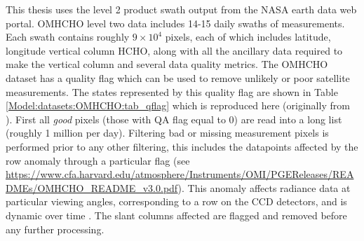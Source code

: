     This thesis uses the level 2 product swath output from the NASA earth data web portal.
    OMHCHO level two data includes 14-15 daily swaths of measurements.
    Each swath contains roughly $9 \times 10^4$ pixels, each of which includes latitude, longitude vertical column HCHO, along with all the ancillary data required to make the vertical column and several data quality metrics.
    The OMHCHO dataset has a quality flag which can be used to remove unlikely or poor satellite measurements.
    The states represented by this quality flag are shown in Table \ref{Model:datasets:OMHCHO:tab_qflag} which is reproduced here (originally from \textcite{Kurosu2014}).
    First all \textit{good} pixels (those with QA flag equal to 0) are read into a long list (roughly 1 million per day).
    Filtering bad or missing measurement pixels is performed prior to any other filtering, this includes the datapoints affected by the row anomaly through a particular flag (see \url{https://www.cfa.harvard.edu/atmosphere/Instruments/OMI/PGEReleases/READMEs/OMHCHO_README_v3.0.pdf}).
    This anomaly affects radiance data at particular viewing angles, corresponding to a row on the CCD detectors, and is dynamic over time \parencite{Huang2018}.
    The slant columns affected are flagged and removed before any further processing.
    

